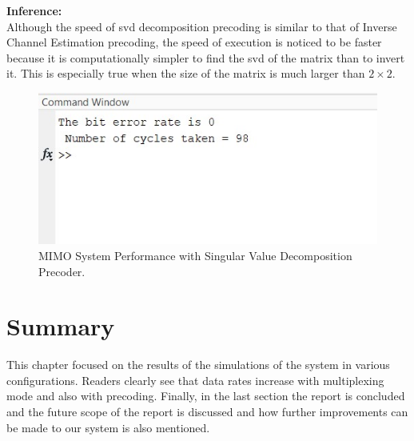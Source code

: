 \textbf{Inference:}\\
Although the speed of \acrshort{svd} decomposition precoding is similar to that of Inverse Channel Estimation precoding, the speed of execution is noticed to be faster because it is computationally simpler to find the \acrshort{svd} of the matrix than to invert it. This is especially true when the size of the matrix is much larger than $2 \times 2$.

\begin{figure}[!htbp]
\centering
\includegraphics[scale=1]{Chapter 4/Figures/MIMO System Performance Inverse Channel Estimation}
\caption{MIMO System Performance with Singular Value Decomposition Precoder.}
\label{fig:mimo system performance singular value decomposition}
\end{figure}

\section*{Summary}
This chapter focused on the results of the simulations of the system in various configurations. Readers clearly see that data rates increase with multiplexing mode and also with precoding. Finally, in the last section the report is concluded and the future scope of the report is discussed and how further improvements can be made to our system is also mentioned.




